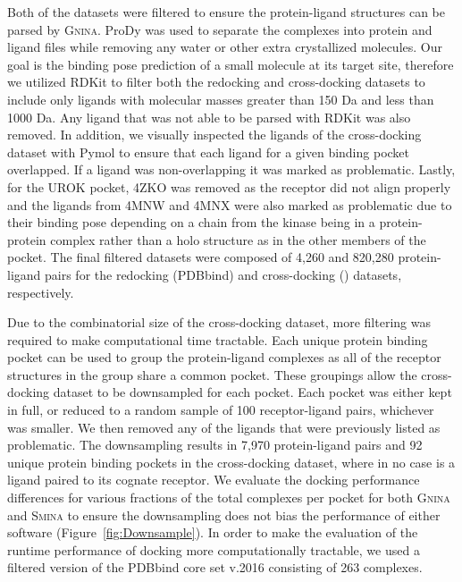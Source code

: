 \documentclass[journal=jcisd8,manuscript=article]{achemso}
\begin{document}
Both of the datasets were filtered to ensure the protein-ligand structures can be parsed by \textsc{Gnina}. ProDy\cite{bakan2011prody} was used to separate the complexes into protein and ligand files while removing any water or other extra crystallized molecules. Our goal is the binding pose prediction of a small molecule at its target site, therefore we utilized RDKit\cite{rdkit} to filter both the redocking and cross-docking datasets to include only ligands with molecular masses greater than 150 Da and less than 1000 Da. Any ligand that was not able to be parsed with RDKit was also removed. In addition, we visually inspected the ligands of the cross-docking dataset with Pymol\cite{PyMOL} to ensure that each ligand for a given binding pocket overlapped. If a ligand was non-overlapping it was marked as problematic. Lastly, for the UROK pocket, 4ZKO was removed as the receptor did not align properly and the ligands from 4MNW and 4MNX were also marked as problematic due to their binding pose depending on a chain from the kinase being in a protein-protein complex rather than a holo structure as in the other members of the pocket. The final filtered datasets were composed of 4,260 and 820,280 protein-ligand pairs for the redocking (PDBbind\cite{liu2017forging}) and cross-docking (\citet{wierbowski2020cross}) datasets, respectively.

Due to the combinatorial size of the cross-docking dataset, more filtering was required to make computational time tractable. Each unique protein binding pocket can be used to group the protein-ligand complexes as all of the receptor structures in the group share a common pocket. These groupings allow the cross-docking dataset to be downsampled for each pocket. Each pocket was either kept in full, or reduced to a random sample of 100 receptor-ligand pairs, whichever was smaller. We then removed any of the ligands that were previously listed as problematic. The downsampling results in 7,970 protein-ligand pairs and 92 unique protein binding pockets in the cross-docking dataset, where in no case is a ligand paired to its cognate receptor. We evaluate the docking performance differences for various fractions of the total complexes per pocket for both \textsc{Gnina} and \textsc{Smina} to ensure the downsampling does not bias the performance of either software (Figure~\ref{fig:Downsample}). In order to make the evaluation of the runtime performance of docking more computationally tractable, we used a filtered version of the PDBbind core set v.2016\cite{su2018comparative} consisting of 263 complexes.
\end{document}
